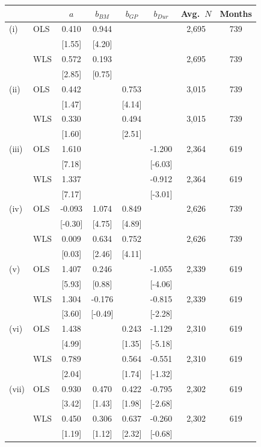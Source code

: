 \begin{tabular}{llcccccc}
\toprule
 &  & $a$ & $b_{\mathit{BM}}$ & $b_{\mathit{GP}}$ & $b_{\mathit{Dur}}$ & Avg.\ $N$ & Months \\
\midrule
(i) & OLS & 0.410 & 0.944 &  &  & 2,695 & 739 \\
 &  & [1.55] & [4.20] &  &  &  &  \\
 & WLS & 0.572 & 0.193 &  &  & 2,695 & 739 \\
 &  & [2.85] & [0.75] &  &  &  &  \\
\addlinespace
(ii) & OLS & 0.442 &  & 0.753 &  & 3,015 & 739 \\
 &  & [1.47] &  & [4.14] &  &  &  \\
 & WLS & 0.330 &  & 0.494 &  & 3,015 & 739 \\
 &  & [1.60] &  & [2.51] &  &  &  \\
\addlinespace
(iii) & OLS & 1.610 &  &  & -1.200 & 2,364 & 619 \\
 &  & [7.18] &  &  & [-6.03] &  &  \\
 & WLS & 1.337 &  &  & -0.912 & 2,364 & 619 \\
 &  & [7.17] &  &  & [-3.01] &  &  \\
\addlinespace
(iv) & OLS & -0.093 & 1.074 & 0.849 &  & 2,626 & 739 \\
 &  & [-0.30] & [4.75] & [4.89] &  &  &  \\
 & WLS & 0.009 & 0.634 & 0.752 &  & 2,626 & 739 \\
 &  & [0.03] & [2.46] & [4.11] &  &  &  \\
\addlinespace
(v) & OLS & 1.407 & 0.246 &  & -1.055 & 2,339 & 619 \\
 &  & [5.93] & [0.88] &  & [-4.06] &  &  \\
 & WLS & 1.304 & -0.176 &  & -0.815 & 2,339 & 619 \\
 &  & [3.60] & [-0.49] &  & [-2.28] &  &  \\
\addlinespace
(vi) & OLS & 1.438 &  & 0.243 & -1.129 & 2,310 & 619 \\
 &  & [4.99] &  & [1.35] & [-5.18] &  &  \\
 & WLS & 0.789 &  & 0.564 & -0.551 & 2,310 & 619 \\
 &  & [2.04] &  & [1.74] & [-1.32] &  &  \\
\addlinespace
(vii) & OLS & 0.930 & 0.470 & 0.422 & -0.795 & 2,302 & 619 \\
 &  & [3.42] & [1.43] & [1.98] & [-2.68] &  &  \\
 & WLS & 0.450 & 0.306 & 0.637 & -0.260 & 2,302 & 619 \\
 &  & [1.19] & [1.12] & [2.32] & [-0.68] &  &  \\
\bottomrule
\end{tabular}
